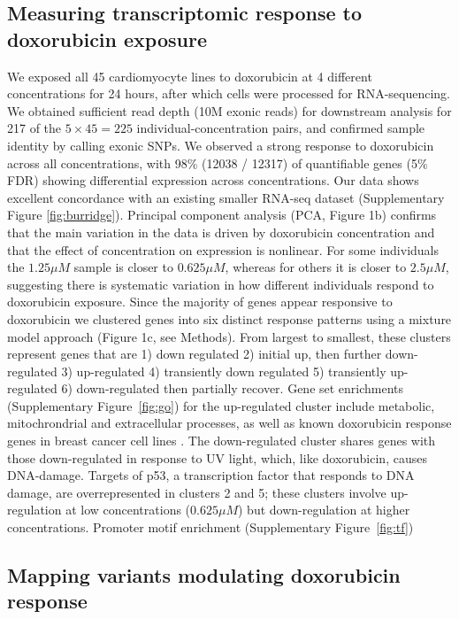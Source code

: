 \documentclass{article}
\begin{document}
{\subsection*{Measuring transcriptomic response to doxorubicin exposure}

We exposed all 45 cardiomyocyte lines to doxorubicin at 4 different concentrations for 24 hours, after which cells were processed for RNA-sequencing. We obtained sufficient read depth (10M exonic reads) for downstream analysis for 217 of the $5 \times 45 = 225$ individual-concentration pairs, and confirmed sample identity by calling exonic SNPs. We observed a strong response to doxorubicin across all concentrations, with 98\% (12038 / 12317) of quantifiable genes (5\% FDR) showing differential expression across concentrations. Our data shows excellent concordance with an existing smaller RNA-seq dataset\cite{Burridge2016} (Supplementary Figure \ref{fig:burridge}). Principal component analysis (PCA, Figure 1b) confirms that the main variation in the data is driven by doxorubicin concentration and that the effect of concentration on expression is nonlinear. For some individuals the $1.25\mu M$ sample is closer to $0.625 \mu M$, whereas for others it is closer to $2.5\mu M$, suggesting there is systematic variation in how different individuals respond to doxorubicin exposure. Since the majority of genes appear responsive to doxorubicin we clustered genes into six distinct response patterns using a mixture model approach (Figure 1c, see Methods). From largest to smallest, these clusters represent genes that are 1) down regulated 2) initial up, then further down-regulated 3) up-regulated 4) transiently down regulated 5) transiently up-regulated 6) down-regulated then partially recover. Gene set enrichments (Supplementary Figure~\ref{fig:go}) for the up-regulated cluster include metabolic, mitochrondrial and extracellular processes, as well as known doxorubicin response genes in breast cancer cell lines \cite{graessmann2007chemotherapy}. The down-regulated cluster shares genes with those down-regulated in response to UV light, which, like doxorubicin, causes DNA-damage. Targets of p53, a transcription factor that responds to DNA damage, are overrepresented in clusters 2 and 5; these clusters involve up-regulation at low concentrations ($0.625\mu M$) but down-regulation at higher concentrations. Promoter motif enrichment (Supplementary Figure~\ref{fig:tf}) 

\subsection*{Mapping variants modulating doxorubicin response}

}
\end{document}
